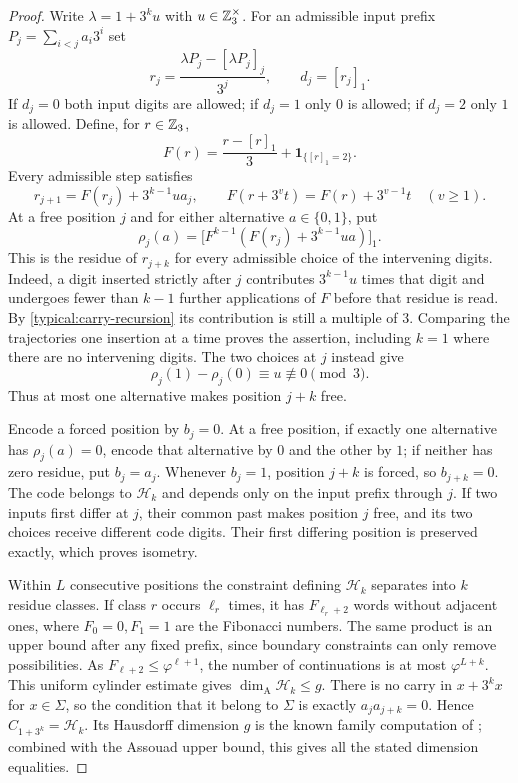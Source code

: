 \begin{proof}
Write $\lambda=1+3^ku$ with $u\in\mathbb Z_3^\times$.
For an admissible input prefix $P_j=\sum_{i<j}a_i3^i$ set
\[
 r_j=\frac{\lambda P_j-[\lambda P_j]_j}{3^j},
 \qquad d_j=[r_j]_1.
\]
If $d_j=0$ both input digits are allowed; if $d_j=1$ only $0$
is allowed; if $d_j=2$ only $1$ is allowed. Define, for $r\in\mathbb Z_3$,
\[
 F(r)=\frac{r-[r]_1}{3}+\boldsymbol1_{\{[r]_1=2\}}.
\]
Every admissible step satisfies
\begin{equation}\label{typical:carry-recursion}
 r_{j+1}=F(r_j)+3^{k-1}ua_j,
 \qquad
 F(r+3^vt)=F(r)+3^{v-1}t\quad(v\ge1).
\end{equation}
At a free position $j$ and for either alternative $a\in\{0,1\}$,
put
\[
 \rho_j(a)=\big[F^{k-1}(F(r_j)+3^{k-1}ua)\big]_1.
\]
This is the residue of $r_{j+k}$ for every admissible choice of the
intervening digits. Indeed, a digit inserted strictly after $j$
contributes $3^{k-1}u$ times that digit and undergoes fewer than
$k-1$ further applications of $F$ before that residue is read.
By \eqref{typical:carry-recursion} its contribution is still a
multiple of $3$. Comparing the trajectories one insertion at a time
proves the assertion, including $k=1$ where there are no intervening
digits. The two choices at $j$ instead give
\[
 \rho_j(1)-\rho_j(0)\equiv u\not\equiv0\pmod3.
\]
Thus at most one alternative makes position $j+k$ free.

Encode a forced position by $b_j=0$. At a free position, if exactly
one alternative has $\rho_j(a)=0$, encode that alternative by $0$
and the other by $1$; if neither has zero residue, put $b_j=a_j$.
Whenever $b_j=1$, position $j+k$ is forced, so $b_{j+k}=0$.
The code belongs to $\mathcal H_k$ and depends only on the input
prefix through $j$. If two inputs first differ at $j$, their common
past makes position $j$ free, and its two choices receive different
code digits. Their first differing position is preserved exactly,
which proves isometry.

Within $L$ consecutive positions the constraint defining
$\mathcal H_k$ separates into $k$ residue classes. If class $r$
occurs $\ell_r$ times, it has $F_{\ell_r+2}$ words without adjacent
ones, where $F_0=0,F_1=1$ are the Fibonacci numbers. The same product
is an upper bound after any fixed prefix, since boundary constraints
can only remove possibilities. As $F_{\ell+2}\le\varphi^{\ell+1}$,
the number of continuations is at most $\varphi^{L+k}$. This uniform
cylinder estimate gives $\dim_{\mathrm A}\mathcal H_k\le g$.
There is no carry in $x+3^kx$ for $x\in\Sigma$, so the condition
that it belong to $\Sigma$ is exactly $a_ja_{j+k}=0$.
Hence $C_{1+3^k}=\mathcal H_k$. Its Hausdorff dimension $g$ is the
known family computation of \cite[Theorems~2.3 and~5.5]{AL2014};
combined with the Assouad upper bound, this gives all the stated
dimension equalities.


\end{proof}
